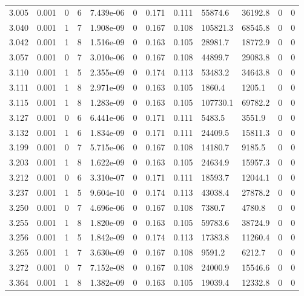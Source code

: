 \documentclass[preview]{standalone}
\begin{document}
{{{\begin{tabular}{L{1.2cm}C{1.2cm} C{0.3cm}C{0.5cm} C{1.4cm}C{1.4cm} C{1.4cm}C{1.4cm} C{1.6cm}C{1.6cm} C{1.6cm}C{1.6cm}}
  3.005  &  0.001  & 0     &  6 &  7.439e-06  & 0  &  0.171&   0.111& 55874.6 & 36192.8   &  0 & 0  \\ 
  3.040  &  0.001  & 1     &  7 &  1.908e-09  & 0  &  0.167&   0.108& 105821.3 & 68545.8   &  0 & 0  \\ 
  3.042  &  0.001  & 1     &  8 &  1.516e-09  & 0  &  0.163&   0.105& 28981.7 & 18772.9   &  0 & 0  \\ 
  3.057  &  0.001  & 0     &  7 &  3.010e-06  & 0  &  0.167&   0.108& 44899.7 & 29083.8   &  0 & 0  \\ 
  3.110  &  0.001  & 1     &  5 &  2.355e-09  & 0  &  0.174&   0.113& 53483.2 & 34643.8   &  0 & 0  \\ 
  3.111  &  0.001  & 1     &  8 &  2.971e-09  & 0  &  0.163&   0.105& 1860.4 & 1205.1   &  0 & 0  \\ 
  3.115  &  0.001  & 1     &  8 &  1.283e-09  & 0  &  0.163&   0.105& 107730.1 & 69782.2   &  0 & 0  \\ 
  3.127  &  0.001  & 0     &  6 &  6.441e-06  & 0  &  0.171&   0.111& 5483.5 & 3551.9   &  0 & 0  \\ 
  3.132  &  0.001  & 1     &  6 &  1.834e-09  & 0  &  0.171&   0.111& 24409.5 & 15811.3   &  0 & 0  \\ 
  3.199  &  0.001  & 0     &  7 &  5.715e-06  & 0  &  0.167&   0.108& 14180.7 & 9185.5   &  0 & 0  \\ 
  3.203  &  0.001  & 1     &  8 &  1.622e-09  & 0  &  0.163&   0.105& 24634.9 & 15957.3   &  0 & 0  \\ 
  3.212  &  0.001  & 0     &  6 &  3.310e-07  & 0  &  0.171&   0.111& 18593.7 & 12044.1   &  0 & 0  \\ 
  3.237  &  0.001  & 1     &  5 &  9.604e-10  & 0  &  0.174&   0.113& 43038.4 & 27878.2   &  0 & 0  \\ 
  3.250  &  0.001  & 0     &  7 &  4.696e-06  & 0  &  0.167&   0.108& 7380.7 & 4780.8   &  0 & 0  \\ 
  3.255  &  0.001  & 1     &  8 &  1.820e-09  & 0  &  0.163&   0.105& 59783.6 & 38724.9   &  0 & 0  \\ 
  3.256  &  0.001  & 1     &  5 &  1.842e-09  & 0  &  0.174&   0.113& 17383.8 & 11260.4   &  0 & 0  \\ 
  3.265  &  0.001  & 1     &  7 &  3.630e-09  & 0  &  0.167&   0.108& 9591.2 & 6212.7   &  0 & 0  \\ 
  3.272  &  0.001  & 0     &  7 &  7.152e-08  & 0  &  0.167&   0.108& 24000.9 & 15546.6   &  0 & 0  \\ 
  3.364  &  0.001  & 1     &  8 &  1.382e-09  & 0  &  0.163&   0.105& 19039.4 & 12332.8   &  0 & 0  \\ 

\end{tabular}}}}
\end{document}
